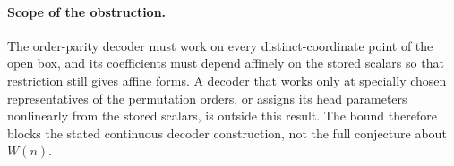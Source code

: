 \documentclass[11pt]{article}
\begin{document}
\paragraph{Scope of the obstruction.}
The order-parity decoder must work on every distinct-coordinate point
of the open box, and its coefficients must depend affinely on the
stored scalars so that restriction still gives affine forms. A decoder
that works only at specially chosen representatives of the permutation
orders, or assigns its head parameters nonlinearly from the stored
scalars, is outside this result. The bound therefore blocks the stated
continuous decoder construction, not the full conjecture about $W(n)$.
\end{document}
